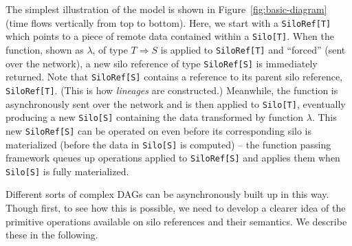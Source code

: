 \documentclass{jfp1}
\begin{document}
The simplest illustration of the model is shown in
Figure~\ref{fig:basic-diagram} (time flows vertically from top to bottom). Here,
we start with a \verb|SiloRef[T]| which points to a piece of remote data
contained within a \verb|Silo[T]|. When the function, shown as $\lambda$, of
type $T \Rightarrow S$ is applied to \verb|SiloRef[T]| and ``forced'' (sent over
the network), a new silo reference of type \verb|SiloRef[S]| is immediately
returned. Note that \verb|SiloRef[S]| contains a reference to its parent silo
reference, \verb|SiloRef[T]|. (This is how {\em lineages} are constructed.)
Meanwhile, the function is asynchronously sent over the network and is then applied
to \verb|Silo[T]|, eventually producing a new \verb|Silo[S]| containing the data
transformed by function $\lambda$. This new \verb|SiloRef[S]| can be operated on
even before its corresponding silo is materialized (\ie before the data in
\verb|Silo[S]| is computed) – the function passing framework queues up
operations applied to \verb|SiloRef[S]| and applies them when \verb|Silo[S]| is
fully materialized.

Different sorts of complex DAGs can be asynchronously built up in this way.
Though first, to see how this is possible, we need to develop a clearer idea of
the primitive operations available on silo references and their semantics. We
describe these in the following.
\end{document}
